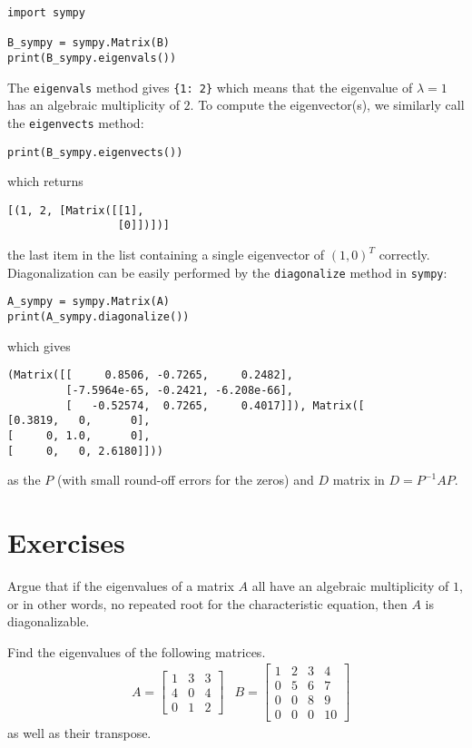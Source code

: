 \begin{lstlisting}
import sympy

B_sympy = sympy.Matrix(B)
print(B_sympy.eigenvals())
\end{lstlisting}
The \verb|eigenvals| method gives \verb|{1: 2}| which means that the eigenvalue of $\lambda = 1$ has an algebraic multiplicity of $2$. To compute the eigenvector(s), we similarly call the \verb|eigenvects| method:
\begin{lstlisting}
print(B_sympy.eigenvects())    
\end{lstlisting}
which returns 
\begin{lstlisting}
[(1, 2, [Matrix([[1],
                 [0]])])]
\end{lstlisting}
the last item in the list containing a single eigenvector of $(1,0)^T$ correctly. Diagonalization can be easily performed by the \verb|diagonalize| method in \texttt{sympy}:
\begin{lstlisting}
A_sympy = sympy.Matrix(A)
print(A_sympy.diagonalize())    
\end{lstlisting}
which gives
\begin{lstlisting}
(Matrix([[     0.8506, -0.7265,     0.2482],
         [-7.5964e-65, -0.2421, -6.208e-66],
         [   -0.52574,  0.7265,     0.4017]]), Matrix([
[0.3819,   0,      0],
[     0, 1.0,      0],
[     0,   0, 2.6180]]))
\end{lstlisting}
as the $P$ (with small round-off errors for the zeros) and $D$ matrix in $D = P^{-1}AP$.

\section{Exercises}

\begin{Exercise}
Argue that if the eigenvalues of a matrix $A$ all have an algebraic multiplicity of $1$, or in other words, no repeated root for the characteristic equation, then $A$ is diagonalizable. 
\end{Exercise}

\begin{Exercise}
Find the eigenvalues of the following matrices.
\begin{align*}
&A =
\begin{bmatrix}
1 & 3 & 3\\
4 & 0 & 4\\
0 & 1 & 2
\end{bmatrix}
&B =
\begin{bmatrix}
1 & 2 & 3 & 4\\
0 & 5 & 6 & 7\\
0 & 0 & 8 & 9\\
0 & 0 & 0 & 10
\end{bmatrix}
\end{align*}
as well as their transpose.
\end{Exercise}

